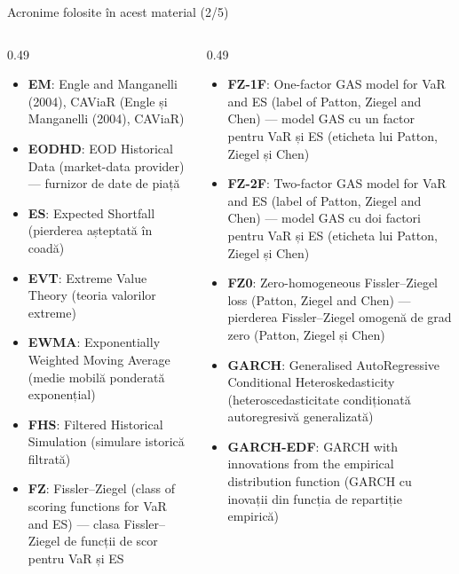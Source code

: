 \begin{frame}{Acronime folosite în acest material (2/5)}
\begin{columns}[T]
\begin{column}{0.49\textwidth}
\begin{itemize}\setlength{\itemsep}{0pt}
    \item \textbf{EM}: Engle and Manganelli (2004), CAViaR (Engle și Manganelli (2004), CAViaR)
    \item \textbf{EODHD}: EOD Historical Data (market-data provider) — furnizor de date de piață
    \item \textbf{ES}: Expected Shortfall (pierderea așteptată în coadă)
    \item \textbf{EVT}: Extreme Value Theory (teoria valorilor extreme)
    \item \textbf{EWMA}: Exponentially Weighted Moving Average (medie mobilă ponderată exponențial)
    \item \textbf{FHS}: Filtered Historical Simulation (simulare istorică filtrată)
    \item \textbf{FZ}: Fissler–Ziegel (class of scoring functions for VaR and ES) — clasa Fissler–Ziegel de funcții de scor pentru VaR și ES
\end{itemize}
\end{column}
\begin{column}{0.49\textwidth}
\begin{itemize}\setlength{\itemsep}{0pt}
    \item \textbf{FZ-1F}: One-factor GAS model for VaR and ES (label of Patton, Ziegel and Chen) — model GAS cu un factor pentru VaR și ES (eticheta lui Patton, Ziegel și Chen)
    \item \textbf{FZ-2F}: Two-factor GAS model for VaR and ES (label of Patton, Ziegel and Chen) — model GAS cu doi factori pentru VaR și ES (eticheta lui Patton, Ziegel și Chen)
    \item \textbf{FZ0}: Zero-homogeneous Fissler–Ziegel loss (Patton, Ziegel and Chen) — pierderea Fissler–Ziegel omogenă de grad zero (Patton, Ziegel și Chen)
    \item \textbf{GARCH}: Generalised AutoRegressive Conditional Heteroskedasticity (heteroscedasticitate condiționată autoregresivă generalizată)
    \item \textbf{GARCH-EDF}: GARCH with innovations from the empirical distribution function (GARCH cu inovații din funcția de repartiție empirică)
\end{itemize}
\end{column}
\end{columns}
\end{frame}
